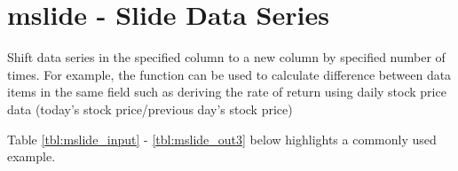 
%

\section{mslide - Slide Data Series\label{sect:mslide}}
Shift data series in the specified column to a new column by specified number of times. 
For example, the function can be used to calculate difference between data items in the same field such as deriving the rate of return using daily stock price data (today's stock price/previous day's stock price)

Table \ref{tbl:mslide_input} - \ref{tbl:mslide_out3} below highlights a commonly used example.


